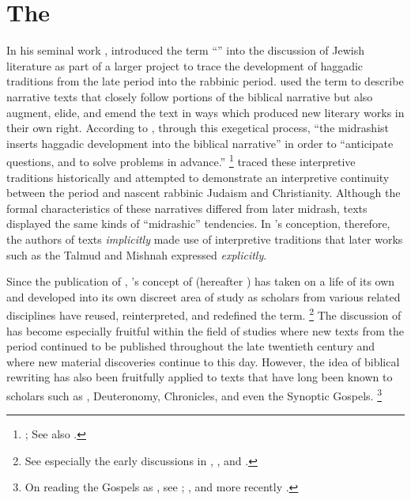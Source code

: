 
\chapter{The \rwb}
\label{chap:rwb}

In his seminal work , \Vermes introduced the term ``\rwB'' into the discussion of \secondtemple Jewish literature as part of a larger project to trace the development of haggadic traditions from the late \secondtemple period into the rabbinic period. \vermes used the term \rwB to describe narrative texts that closely follow portions of the biblical narrative but also augment, elide, and emend the text in ways which produced new literary works in their own right. According to \vermes, through this exegetical process, ``the midrashist inserts haggadic development into the biblical narrative'' in order to ``anticipate questions, and to solve problems in advance.''%
    \footnote{%
        \Cite[95]{vermes1961}; See also
        \cite{vermes_zsengeller2014}.}
\vermes traced these interpretive traditions historically and attempted to demonstrate an interpretive continuity between the \secondtemple period and nascent rabbinic Judaism and Christianity. Although the formal characteristics of these narratives differed from later midrash, \rwB texts displayed the same kinds of ``midrashic'' tendencies. In \vermes's conception, therefore, the authors of \rwB texts \emph{implicitly} made use of interpretive traditions that later works such as the Talmud and Mishnah expressed \emph{explicitly}. 

Since the publication of , \vermes's concept of \rwB (hereafter \rwb) has taken on a life of its own and developed into its own discreet area of study as scholars from various related disciplines have reused, reinterpreted, and redefined the term.%
    \footnote{%
        See especially the early discussions in 
        \cite{alexander_carson-williamson1988}, 
        \cite{nickelsburg_stone1984}, and \cite{harrington_kraft-nickelsburg1986}.}
The discussion of \rwb has become especially fruitful within the field of \qumran studies where new texts from the \secondtemple period continued to be published throughout the late twentieth century and where new material discoveries continue to this day. However, the idea of biblical rewriting has also been fruitfully applied to texts that have long been known to scholars such as \jub, Deuteronomy, Chronicles, and even the Synoptic Gospels.%
    \footnote{%
        On reading the Gospels as \rwb, see 
        \cite{müller_back-kankaanniemi2012}; 
        \cite{malan_hts2014}, and more recently 
        \cite{allen_jsnt2018}.}

